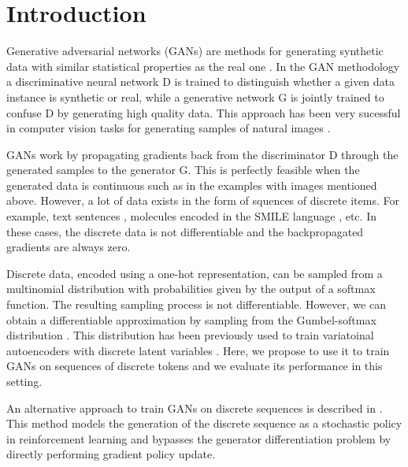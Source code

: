 \section{Introduction}

Generative adversarial networks (GANs) are methods for generating synthetic
data with similar statistical properties as the real one
\cite{goodfellow2014generative}. In the GAN methodology a discriminative neural network D is
trained to distinguish whether a given data instance is synthetic or real,
while a generative network G is jointly trained to confuse D by generating high
quality data. This approach has been very sucessful in computer vision tasks for
generating samples of natural images
\cite{denton2015deep,dosovitskiy2016generating,radford2016}.

GANs work by propagating gradients back from the discriminator D through the
generated samples to the generator G. This is perfectly feasible when the
generated data is continuous such as in the examples with images mentioned
above. However, a lot of data exists in the form of squences of discrete items.
For example, text sentences \cite{Bowman2016}, molecules encoded in the SMILE language \cite{gomez2016automatic}, etc. In these
cases, the discrete data is not differentiable and the backpropagated gradients
are always zero. 

Discrete data, encoded using a one-hot representation, can be sampled from a
multinomial distribution with probabilities given by the output of a softmax
function. The resulting sampling process is not differentiable.  However, we can obtain
a differentiable approximation by sampling from the Gumbel-softmax distribution
\cite{jang2016categorical}. This distribution has been previously used to train
variatoinal autoencoders with discrete latent variables \cite{jang2016categorical}. Here, we propose to
use it to train GANs on sequences of discrete tokens and we evaluate its
performance in this setting.

An alternative approach to train GANs on discrete sequences is described in
\cite{yu2016seqgan}. This method models the generation of the discrete sequence
as a stochastic policy in reinforcement learning and bypasses the generator
differentiation problem by directly performing gradient policy update.

